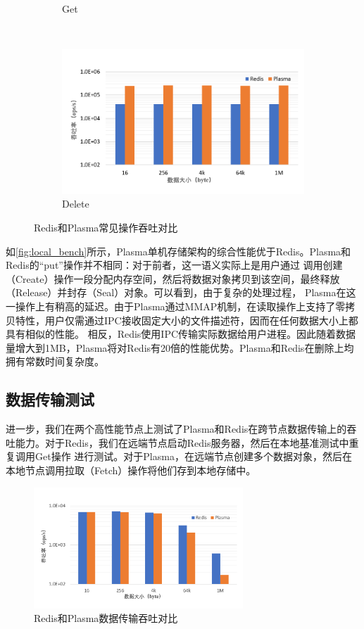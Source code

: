 \begin{figure}[h]
\begin{subfigure}{0.49\textwidth}
        \caption{Get}
    \end{subfigure}
    \\
    \centering
    \begin{subfigure}{0.49\textwidth}
        \includegraphics[width=\textwidth]{image/chap02/del.png}
        \caption{Delete}
    \end{subfigure}
    \caption{Redis和Plasma常见操作吞吐对比}
    \label{fig:local_bench}
\end{figure}

如\autoref{fig:local_bench}所示，Plasma单机存储架构的综合性能优于Redis。Plasma和Redis的“put”操作并不相同：对于前者，这一语义实际上是用户通过
调用创建（Create）操作一段分配内存空间，然后将数据对象拷贝到该空间，最终释放（Release）并封存（Seal）对象。可以看到，由于复杂的处理过程，
Plasma在这一操作上有稍高的延迟。由于Plasma通过MMAP机制，在读取操作上支持了零拷贝特性，用户仅需通过IPC接收固定大小的文件描述符，因而在任何数据大小上都具有相似的性能。
相反，Redis使用IPC传输实际数据给用户进程。因此随着数据量增大到1MB，Plasma将对Redis有20倍的性能优势。Plasma和Redis在删除上均拥有常数时间复杂度。

\subsection{数据传输测试}

进一步，我们在两个高性能节点上测试了Plasma和Redis在跨节点数据传输上的吞吐能力。对于Redis，我们在远端节点启动Redis服务器，然后在本地基准测试中重复调用Get操作
进行测试。对于Plasma，在远端节点创建多个数据对象，然后在本地节点调用拉取（Fetch）操作将他们存到本地存储中。

\begin{figure}[h]
    \centering
    \includegraphics[width=0.7\textwidth]{image/chap02/fetch.png}
    \caption{Redis和Plasma数据传输吞吐对比}
    \label{fig:remote_bench}
\end{figure}

